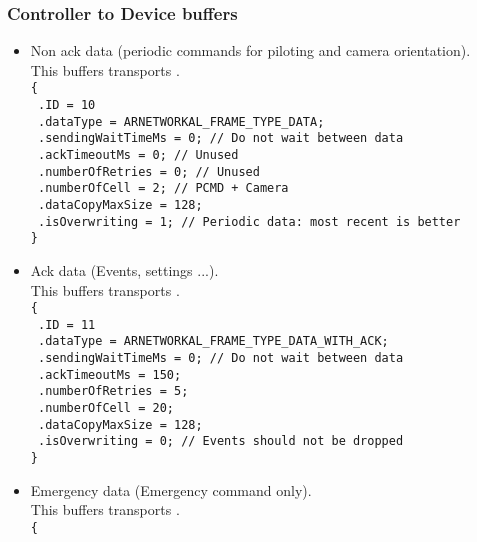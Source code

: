 \subsubsection*{Controller to Device buffers}
\begin{itemize}
\item{
    Non ack data (periodic commands for piloting and camera orientation).\\
    This buffers transports .\\
    \texttt{\{}\\
    \texttt{  .ID = 10}\\
    \texttt{  .dataType = ARNETWORKAL\_FRAME\_TYPE\_DATA;}\\
    \texttt{  .sendingWaitTimeMs = 0; // Do not wait between data}\\
    \texttt{  .ackTimeoutMs = 0; // Unused}\\
    \texttt{  .numberOfRetries = 0; // Unused}\\
    \texttt{  .numberOfCell = 2; // PCMD + Camera}\\
    \texttt{  .dataCopyMaxSize = 128;}\\
    \texttt{  .isOverwriting = 1; // Periodic data: most recent is better}\\
    \texttt{\}}
  }
\item{
    Ack data (Events, settings ...).\\
    This buffers transports .\\
    \texttt{\{}\\
    \texttt{  .ID = 11}\\
    \texttt{  .dataType = ARNETWORKAL\_FRAME\_TYPE\_DATA\_WITH\_ACK;}\\
    \texttt{  .sendingWaitTimeMs = 0; // Do not wait between data}\\
    \texttt{  .ackTimeoutMs = 150;}\\
    \texttt{  .numberOfRetries = 5;}\\
    \texttt{  .numberOfCell = 20;}\\
    \texttt{  .dataCopyMaxSize = 128;}\\
    \texttt{  .isOverwriting = 0; // Events should not be dropped}\\
    \texttt{\}}
}
\item{
    Emergency data (Emergency command only).\\
    This buffers transports .\\
    \texttt{\{}\\
}
\end{itemize}

